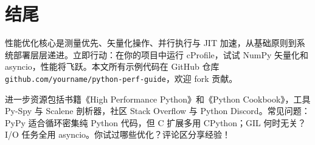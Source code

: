 \chapter{结尾}
性能优化核心是测量优先、矢量化操作、并行执行与 JIT 加速，从基础原则到系统部署层层递进。立即行动：在你的项目中运行 cProfile，试试 NumPy 矢量化和 asyncio，性能将飞跃。本文所有示例代码在 GitHub 仓库 \texttt{github.com/yourname/python-perf-guide}，欢迎 fork 贡献。\par
进一步资源包括书籍《High Performance Python》和《Python Cookbook》，工具 Py-Spy 与 Scalene 剖析器，社区 Stack Overflow 与 Python Discord。常见问题：PyPy 适合循环密集纯 Python 代码，但 C 扩展多用 CPython；GIL 何时无关？I/O 任务全用 asyncio。你试过哪些优化？评论区分享经验！\par
